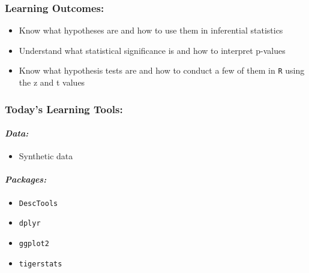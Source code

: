 \documentclass[
]{book}
\providecommand{\tightlist}{%
  \setlength{\itemsep}{0pt}\setlength{\parskip}{0pt}}
\begin{document}
\hypertarget{learning-outcomes-5}{%
\subsubsection*{Learning Outcomes:}\label{learning-outcomes-5}}

\begin{itemize}
\tightlist
\item
  Know what hypotheses are and how to use them in inferential statistics
\item
  Understand what statistical significance is and how to interpret p-values
\item
  Know what hypothesis tests are and how to conduct a few of them in \texttt{R} using the z and t values
\end{itemize}

\hypertarget{todays-learning-tools-5}{%
\subsubsection*{Today's Learning Tools:}\label{todays-learning-tools-5}}

\hypertarget{data-5}{%
\paragraph*{\texorpdfstring{\emph{Data:}}{Data:}}\label{data-5}}

\begin{itemize}
\tightlist
\item
  Synthetic data
\end{itemize}

\hypertarget{packages-6}{%
\paragraph*{\texorpdfstring{\emph{Packages:}}{Packages:}}\label{packages-6}}

\begin{itemize}
\tightlist
\item
  \texttt{DescTools}
\item
  \texttt{dplyr}
\item
  \texttt{ggplot2}
\item
  \texttt{tigerstats}
\end{itemize}
\end{document}
